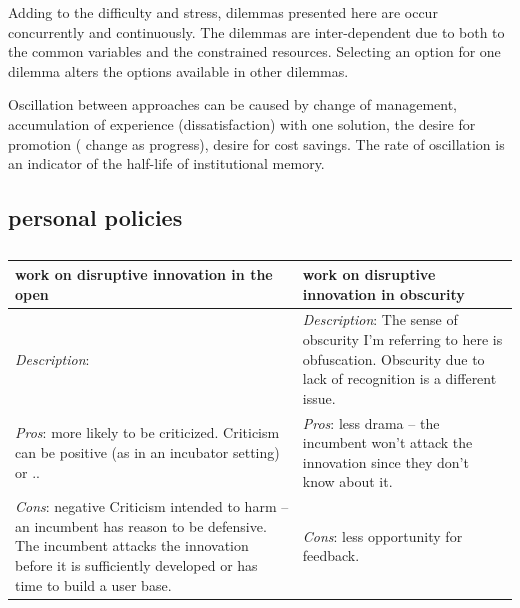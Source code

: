 Adding to the difficulty and stress, dilemmas presented here are occur concurrently and continuously. The dilemmas are inter-dependent due to both to the common variables and the constrained resources.
Selecting an option for one dilemma alters the options available in other dilemmas.

Oscillation between approaches can be caused by change of management, accumulation of experience (dissatisfaction) with one solution, the desire for promotion ( change as progress), desire for cost savings. The rate of oscillation is an indicator of the half-life of institutional memory. 



\subsection{personal policies}

\begin{center}
\begin{table}[ht]
\begin{tabular}{ | m{\dilemmatablewidth}| m{\dilemmatablewidth} | } 
  \hline
  \textbf{work on disruptive innovation in the open} &
  \textbf{work on disruptive innovation in obscurity} \\
  \hline
  \textit{Description}:  &
  \textit{Description}: The sense of obscurity I'm referring to here is obfuscation. Obscurity due to lack of recognition is a different issue.  \\  
  \hline
  \textit{Pros}: more likely to be criticized. Criticism can be positive (as in an incubator setting) or .. & 
  \textit{Pros}: less drama -- the incumbent won't attack the innovation since they don't know about it. \\
  \hline
  \textit{Cons}: negative Criticism intended to harm -- an incumbent has reason to be defensive. The incumbent attacks the innovation before it is sufficiently developed or has time to build a user base. & 
  \textit{Cons}: less opportunity for feedback. \\
  \hline
\end{tabular}
\caption{
}
\label{table:innovate-open-obscure}
\end{table}
\end{center}

